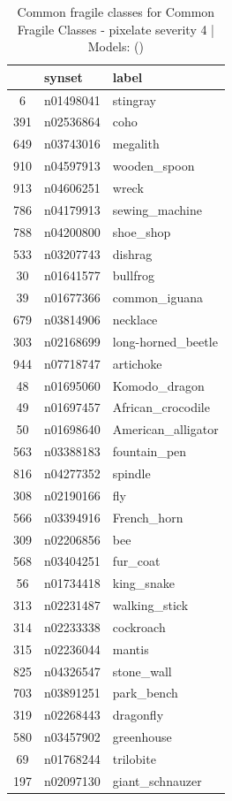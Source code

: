 \begin{table}
\caption{Common fragile classes for Common Fragile Classes - pixelate severity 4 | Models: ()}
\label{tab:Common Fragile Classes - pixelate severity 4_d41d8cd9}
\begin{tabular}{cll}
\toprule
 & synset & label \\
\midrule
6 & n01498041 & stingray \\
391 & n02536864 & coho \\
649 & n03743016 & megalith \\
910 & n04597913 & wooden_spoon \\
913 & n04606251 & wreck \\
786 & n04179913 & sewing_machine \\
788 & n04200800 & shoe_shop \\
533 & n03207743 & dishrag \\
30 & n01641577 & bullfrog \\
39 & n01677366 & common_iguana \\
679 & n03814906 & necklace \\
303 & n02168699 & long-horned_beetle \\
944 & n07718747 & artichoke \\
48 & n01695060 & Komodo_dragon \\
49 & n01697457 & African_crocodile \\
50 & n01698640 & American_alligator \\
563 & n03388183 & fountain_pen \\
816 & n04277352 & spindle \\
308 & n02190166 & fly \\
566 & n03394916 & French_horn \\
309 & n02206856 & bee \\
568 & n03404251 & fur_coat \\
56 & n01734418 & king_snake \\
313 & n02231487 & walking_stick \\
314 & n02233338 & cockroach \\
315 & n02236044 & mantis \\
825 & n04326547 & stone_wall \\
703 & n03891251 & park_bench \\
319 & n02268443 & dragonfly \\
580 & n03457902 & greenhouse \\
69 & n01768244 & trilobite \\
197 & n02097130 & giant_schnauzer \\

\end{tabular}
\end{table}
